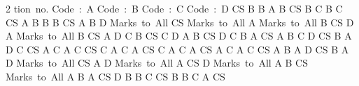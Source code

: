 \documentclass[a4paper,10pt,twoside]{article}
\begin{document}
\begin{multicols}{2}
{tion no. Code : A \newline Code : B \newline Code : C \newline Code : D \newline CS  \newline B \newline B \newline A \newline B \newline CS  \newline B \newline C \newline B \newline C \newline CS  \newline A \newline B \newline B \newline B \newline CS  \newline A \newline B \newline D \newline Marks to All \newline CS  \newline Marks to All \newline A \newline Marks to All \newline B \newline CS  \newline D \newline A \newline Marks to All \newline B \newline CS  \newline A \newline D \newline C \newline B \newline CS  \newline C \newline D \newline A \newline B \newline CS  \newline D \newline C \newline B \newline A \newline CS  \newline A \newline B \newline C \newline D \newline CS  \newline B \newline A \newline D \newline C \newline CS  \newline A \newline C \newline A \newline C \newline CS  \newline C \newline A \newline C \newline A \newline CS  \newline C \newline A \newline C \newline A \newline CS  \newline A \newline C \newline A \newline C \newline CS  \newline A \newline B \newline A \newline D \newline CS  \newline B \newline A \newline D \newline Marks to All \newline CS  \newline A \newline D \newline Marks to All \newline A \newline CS  \newline D \newline Marks to All \newline A \newline B \newline CS  \newline Marks to All \newline A \newline B \newline A \newline CS  \newline D \newline B \newline B \newline C \newline CS  \newline B \newline B \newline C \newline A \newline CS  \newline }
\end{multicols}
\end{document}
